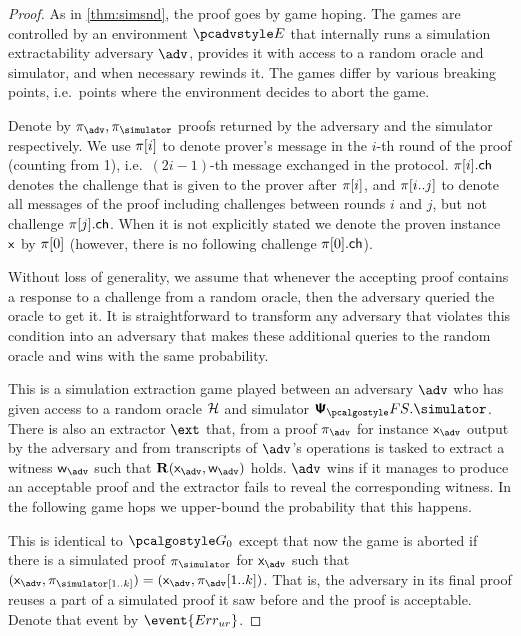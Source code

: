 \documentclass[runningheads,11pt]{llncs}
\begin{document}
\begin{proof}		
As in \cref{thm:simsnd}, the proof goes by game hoping. The games are controlled by an environment
  $\env$ that internally runs a simulation extractability adversary $\advse$,
  provides it with access to a random oracle and simulator, and when necessary
  rewinds it. The games differ by various breaking points, i.e.~points where the
  environment decides to abort the game.

  Denote by $\zkproof_{\advse}, \zkproof_{\simulator}$ proofs returned by the
  adversary and the simulator respectively. We use $\pi[i]$ to denote
  prover's message in the $i$-th round of the proof (counting from 1), i.e.~$(2i
  - 1)$-th message exchanged in the protocol. $\pi[i].\mathsf{ch}$ denotes the
  challenge that is given to the prover after $\pi[i]$, and
  $\pi[i..j]$ to denote all messages of the proof including challenges
  between rounds $i$ and $j$, but not challenge $\pi[j].\mathsf{ch}$. When it is
  not explicitly stated we denote the proven instance $\mathsf{x}$ by $\pi[0]$
  (however, there is no following challenge $\pi[0].\mathsf{ch}$).

  Without loss of generality, we assume that whenever the accepting proof
  contains a response to a challenge from a random oracle, then the
  adversary queried the oracle to get it. It is straightforward to transform any
  adversary that violates this condition into an adversary that makes these
  additional queries to the random oracle and wins with the same probability.

   This is a simulation extraction game played between an adversary
  $\advse$ who has given access to a random oracle $\mathcal{H}$ and simulator
  $\psfs.\simulator$. There is also an extractor $\ext$ that, from a proof
  $\zkproof_{\advse}$ for instance $\inp_{\advse}$ output by the adversary and from
   transcripts of $\advse$'s operations is tasked to extract a witness
  $\wit_{\advse}$ such that $\REL(\inp_{\advse}, \wit_{\advse})$ holds. $\advse$ wins
  if it manages to produce an acceptable proof and the extractor fails to reveal
  the corresponding witness. In the following game hops we upper-bound the
  probability that this happens.

   This is identical to $\game{0}$ except that now the game is aborted
  if there is a simulated proof $\zkproof_\simulator$ for $\inp_{\advse}$ such
  that $(\inp_{\advse}, \zkproof_\simulator[1..k]) = (\inp_{\advse},
  \zkproof_{\advse}[1..k])$. That is, the adversary in its final proof
  reuses a part of a simulated proof it saw before and the proof is acceptable.
  Denote that event by $\event{\errur}$.


\end{proof}
\end{document}
